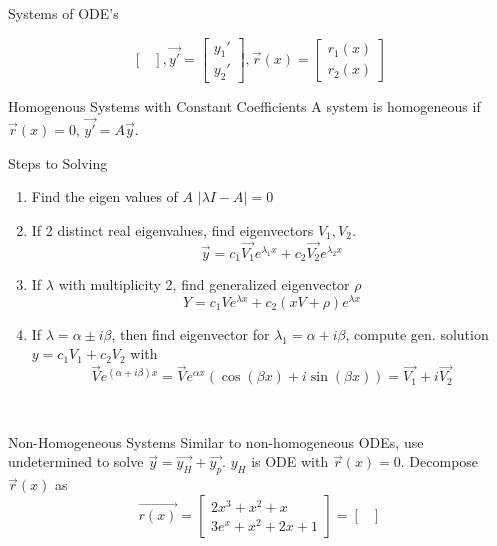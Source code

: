 \documentclass{article}
\begin{document}
\begin{multicols*}{3}
\begin{blackbox}{Systems of ODE's}
{\[\begin{bmatrix}
        \end{bmatrix}, \vec{y'} = \begin{bmatrix}
            y_1'\\
            y_2'
        \end{bmatrix}, \vec{r}(x) = \begin{bmatrix}
            r_1(x)\\
            r_2(x)
        \end{bmatrix}\]
        \begin{redbox}{Homogenous Systems with Constant Coefficients}
            A system is homogeneous if $\vec{r}(x) = 0$, $\vec{y'} = A\vec{y}$.
            \begin{brownbox}{Steps to Solving}
                \begin{enumerate}[leftmargin=5pt]
                    \item Find the eigen values of $A$ $|\lambda I - A| = 0$
                    \item If 2 distinct real eigenvalues, find eigenvectors $V_1,V_2$.\\[-5ex]
                    \[\vec{y} = c_1\vec{V_1}e^{\lambda_1x} + c_2\vec{V_2}e^{\lambda_2x}\]
                    \item If $\lambda$ with multiplicity 2, find generalized eigenvector $\rho$ \\[-4ex]
                    \[Y = c_1Ve^{\lambda x} + c_2(xV + \rho)e^{\lambda x}\]                
                    \item If $\lambda = \alpha \pm i\beta$, then find eigenvector for $\lambda_1 = \alpha + i\beta$, compute gen. solution $y = c_1V_1 + c_2V_2$ with
                    \[\vec{V}e^{(\alpha + i\beta)x} = \vec{V}e^{\alpha x}(\cos(\beta x) + i\sin (\beta x)) = \vec{V_1} + i\vec{V_2}\]
            \end{enumerate}
            \end{brownbox}
        \end{redbox}\\[-2ex]
        \begin{bluebox}{Non-Homogeneous Systems}
            Similar to non-homogeneous ODEs, use undetermined to solve $\vec{y} = \vec{y_H} + \vec{y_p}$. $y_H$ is ODE with $\vec{r}(x) = 0$. Decompose $\vec{r}(x)$ as 
            {\scriptsize
            \[\vec{r(x)} = \begin{bmatrix}
                2 x^3 + x^2 + x \\
                3e^x + x^2 + 2x + 1
            \end{bmatrix} = \begin{bmatrix}

\end{bmatrix}\]}
\end{bluebox}}
\end{blackbox}
\end{multicols*}
\end{document}
